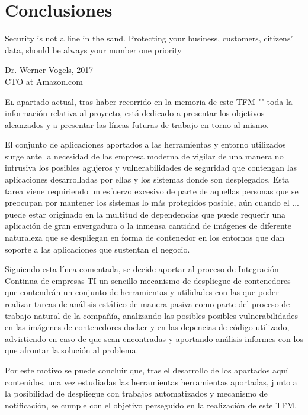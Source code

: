 \chapter{Conclusiones}\label{chp-05}
\epigraph{Security is not a line in the sand. Protecting your business, customers, citizens’ data, should be always your number one priority}{Dr. Werner Vogels, 2017\\CTO at Amazon.com}

\lettrine[lraise=-0.1, lines=2, loversize=0.2]{E}{l} apartado actual, tras haber recorrido en la memoria de este \gls{TFM} "\eltitulo" toda la información relativa al proyecto, está dedicado a presentar los objetivos alcanzados y a presentar las líneas futuras de trabajo en torno al mismo. 

El conjunto de aplicaciones aportados a las herramientas y entorno utilizados surge ante la necesidad de las empresa moderna de vigilar de una manera no intrusiva los posibles agujeros y vulnerabilidades de seguridad que contengan las aplicaciones desarrolladas por ellas y los sistemas donde son desplegados. Esta tarea viene requiriendo un esfuerzo excesivo de parte de aquellas personas que se preocupan por mantener los sistemas lo más protegidos posible, aún cuando el ... puede estar originado en la multitud de dependencias que puede requerir una aplicación de gran envergadura o la inmensa cantidad de imágenes de diferente naturaleza que se despliegan en forma de contenedor en los entornos que dan soporte a las aplicaciones que sustentan el negocio.

Siguiendo esta línea comentada, se decide aportar al proceso de Integración Continua de empresas \gls{TI} un sencillo mecanismo de despliegue de contenedores que contendrán un conjunto de herramientas y utilidades con las que poder realizar tareas de análisis estático de manera pasiva como parte del proceso de trabajo natural de la compañía, analizando las posibles posibles vulnerabilidades en las imágenes de contenedores docker y en las depencias  de código utilizado, advirtiendo en caso de que sean encontradas y aportando análisis informes con los que afrontar la solución al problema.

Por este motivo se puede concluir que, tras el desarrollo de los apartados aquí contenidos, una vez estudiadas las herramientas herramientas aportadas, junto a la posibilidad de despliegue con trabajos automatizados y mecanismo de notificación, se cumple con el objetivo perseguido en la realización de este \gls{TFM}.

